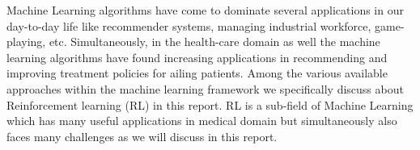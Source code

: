 Machine Learning algorithms have come to dominate several applications in our day-to-day life like  recommender systems, managing industrial workforce, game-playing, etc. Simultaneously, in the health-care domain as well the machine learning algorithms have found increasing applications in recommending and improving treatment policies for ailing patients. Among the various  available approaches within the machine learning framework we specifically discuss about Reinforcement learning (RL) in this report. RL is a sub-field of Machine Learning which has many useful applications in medical domain but simultaneously also faces many challenges as we will discuss in this report. 


